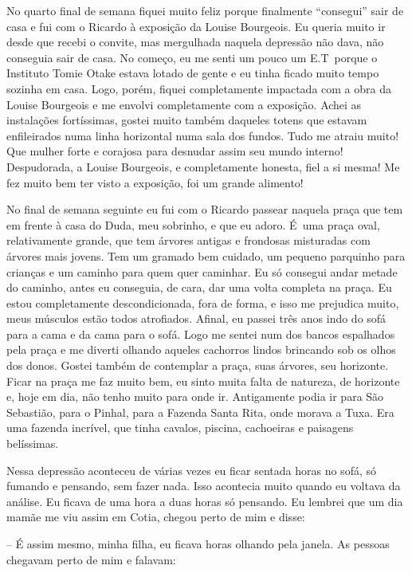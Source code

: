 No quarto final de semana fiquei muito feliz porque finalmente
``consegui'' sair de casa e fui com o Ricardo à exposição da Louise
Bourgeois. Eu queria muito ir desde que recebi o convite, mas mergulhada
naquela depressão não dava, não conseguia sair de casa. No começo, eu me
senti um pouco um E.T\, porque o Instituto Tomie Otake estava lotado de
gente e eu tinha ficado muito tempo sozinha em casa. Logo, porém, fiquei
completamente impactada com a obra da Louise Bourgeois e me envolvi
completamente com a exposição. Achei as instalações fortíssimas, gostei
muito também daqueles totens que estavam enfileirados numa linha
horizontal numa sala dos fundos. Tudo me atraiu muito! Que mulher forte
e corajosa para desnudar assim seu mundo interno! Despudorada, a Louise
Bourgeois, e completamente honesta, fiel a si mesma! Me fez muito bem
ter visto a exposição, foi um grande alimento!

No final de semana seguinte eu fui com o Ricardo passear naquela praça
que tem em frente à casa do Duda, meu sobrinho, e que eu adoro. É~uma
praça oval, relativamente grande, que tem árvores antigas e frondosas
misturadas com árvores mais jovens. Tem um gramado bem cuidado, um
pequeno parquinho para crianças e um caminho para quem quer caminhar. Eu
só consegui andar metade do caminho, antes eu conseguia, de cara, dar
uma volta completa na praça. Eu estou completamente descondicionada,
fora de forma, e isso me prejudica muito, meus músculos estão todos
atrofiados. Afinal, eu passei três anos indo do sofá para a cama e da
cama para o sofá. Logo me sentei num dos bancos espalhados pela praça e
me diverti olhando aqueles cachorros lindos brincando sob os olhos dos
donos. Gostei também de contemplar a praça, suas árvores, seu horizonte.
Ficar na praça me faz muito bem, eu sinto muita falta de natureza, de
horizonte e, hoje em dia, não tenho muito para onde ir. Antigamente
podia ir para São Sebastião, para o Pinhal, para a Fazenda Santa Rita,
onde morava a Tuxa. Era uma fazenda incrível, que tinha cavalos,
piscina, cachoeiras e paisagens belíssimas.

Nessa depressão aconteceu de várias vezes eu ficar sentada horas no
sofá, só fumando e pensando, sem fazer nada. Isso acontecia muito quando
eu voltava da análise. Eu ficava de uma hora a duas horas só pensando.
Eu lembrei que um dia mamãe me viu assim em Cotia, chegou perto de mim e
disse:

-- É assim mesmo, minha filha, eu ficava horas olhando pela janela. As
pessoas chegavam perto de mim e falavam:

